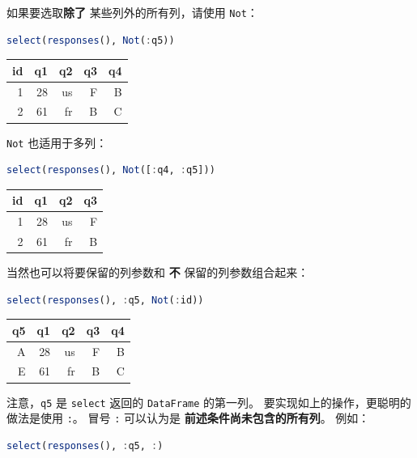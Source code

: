 \documentclass[
  notoc %
]{tufte-book}
\newcommand{\passthrough}[1]{#1}
\begin{document}
如果要选取\textbf{除了} 某些列外的所有列，请使用
\passthrough{\lstinline!Not!}：

\begin{lstlisting}[language=Julia]
select(responses(), Not(:q5))
\end{lstlisting}

\begin{longtable}[]{@{}rrrrr@{}}
\toprule
id & q1 & q2 & q3 & q4 \\
\midrule
\endhead
1 & 28 & us & F & B \\
2 & 61 & fr & B & C \\
\bottomrule
\end{longtable}

\passthrough{\lstinline!Not!} 也适用于多列：

\begin{lstlisting}[language=Julia]
select(responses(), Not([:q4, :q5]))
\end{lstlisting}

\begin{longtable}[]{@{}rrrr@{}}
\toprule
id & q1 & q2 & q3 \\
\midrule
\endhead
1 & 28 & us & F \\
2 & 61 & fr & B \\
\bottomrule
\end{longtable}

当然也可以将要保留的列参数和 \textbf{不} 保留的列参数组合起来：

\begin{lstlisting}[language=Julia]
select(responses(), :q5, Not(:id))
\end{lstlisting}

\begin{longtable}[]{@{}rrrrr@{}}
\toprule
q5 & q1 & q2 & q3 & q4 \\
\midrule
\endhead
A & 28 & us & F & B \\
E & 61 & fr & B & C \\
\bottomrule
\end{longtable}

注意，\passthrough{\lstinline!q5!} 是 \passthrough{\lstinline!select!}
返回的 \passthrough{\lstinline!DataFrame!} 的第一列。
要实现如上的操作，更聪明的做法是使用 \passthrough{\lstinline!:!}。 冒号
\passthrough{\lstinline!:!} 可以认为是
\textbf{前述条件尚未包含的所有列}。 例如：

\begin{lstlisting}[language=Julia]
select(responses(), :q5, :)
\end{lstlisting}
\end{document}
